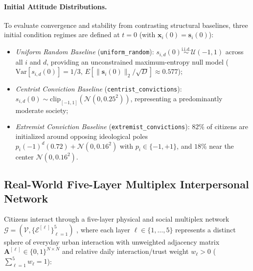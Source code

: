 \paragraph{Initial Attitude Distributions.}
To evaluate convergence and stability from contrasting structural baselines, three initial condition regimes are defined at $t = 0$ (with $\mathbf{x}_i(0) = \mathbf{s}_i(0)$):
\begin{itemize}
    \item \emph{Uniform Random Baseline} (\texttt{uniform\_random}): $s_{i,d}(0) \stackrel{\text{i.i.d.}}{\sim} \mathcal{U}(-1, 1)$ across all $i$ and $d$, providing an unconstrained maximum-entropy null model ($\mathrm{Var}[s_{i,d}(0)] = 1/3$, $E[\|\mathbf{s}_i(0)\|_2/\sqrt{D}] \approx 0.577$);
    \item \emph{Centrist Conviction Baseline} (\texttt{centrist\_convictions}): $s_{i,d}(0) \sim \mathrm{clip}_{[-1,1]}(\mathcal{N}(0, 0.25^2))$, representing a predominantly moderate society;
    \item \emph{Extremist Conviction Baseline} (\texttt{extremist\_convictions}): $82\%$ of citizens are initialized around opposing ideological poles $p_i (-1)^d (0.72) + \mathcal{N}(0, 0.16^2)$ with $p_i \in \{-1, +1\}$, and $18\%$ near the center $\mathcal{N}(0, 0.16^2)$.
\end{itemize}

\subsection{Real-World Five-Layer Multiplex Interpersonal Network}
\label{subsec:multiplex_network}

Citizens interact through a five-layer physical and social multiplex network $\mathcal{G} = (\mathcal{V}, \{\mathcal{E}^{[\ell]}\}_{\ell=1}^5)$ \citep{boccaletti2014structure, kivela2014multilayer}, where each layer $\ell \in \{1, \dots, 5\}$ represents a distinct sphere of everyday urban interaction with unweighted adjacency matrix $\mathbf{A}^{[\ell]} \in \{0, 1\}^{N \times N}$ and relative daily interaction/trust weight $w_\ell > 0$ ($\sum_{\ell=1}^5 w_\ell = 1$):

